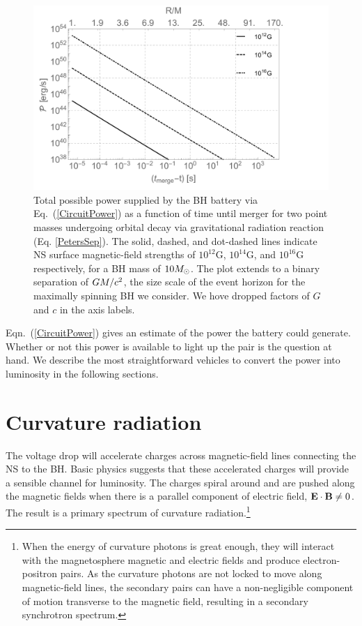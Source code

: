 \begin{figure}
\begin{center}
\includegraphics[scale=0.36]{figures/ch7/Lum_vs_t.pdf}
\end{center}
\caption{Total possible power supplied by the BH battery via
  Eq.\ (\ref{CircuitPower}) as a function of time until merger for two
  point masses undergoing orbital decay via gravitational radiation
  reaction (Eq. \ref{PetersSep}). The solid, dashed, and dot-dashed
  lines indicate NS surface magnetic-field strengths of $10^{12}$G,
  $10^{14}$G, and $10^{16}$G respectively, for a BH mass of $10
  {M_{\odot}}$. The plot extends to a binary separation of $GM/c^2$, the
  size scale of the event horizon for the maximally spinning BH we
  consider. We hove dropped factors of $G$ and $c$ in the axis
  labels.}
\label{Fig:Lum_B_M}
\end{figure}

Eqn.\ (\ref{CircuitPower}) gives an estimate of the power the battery could
generate. Whether or not this power is available to light up the pair
is the question at hand. We describe the most straightforward vehicles
to convert the power into luminosity in the following sections.

\section{Curvature radiation}
The voltage drop will accelerate charges across magnetic-field lines
connecting the NS to the BH. Basic physics suggests that these
accelerated charges will provide a sensible channel for luminosity.
The charges spiral around and are pushed along the magnetic fields
when there is a parallel component of electric field, ${\bf E} \cdot
{\bf B} \ne 0$.  The result is a primary spectrum of curvature
radiation.\footnote{When the energy of curvature photons is great
  enough, they will interact with the magnetosphere magnetic and
  electric fields and produce electron-positron 
  pairs. As the curvature photons are not locked to move along
  magnetic-field lines, the secondary pairs can have a non-negligible
  component of motion transverse to the magnetic field, resulting in a
  secondary synchrotron spectrum.}

